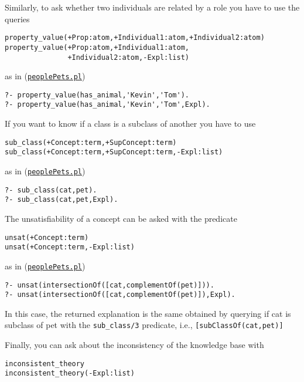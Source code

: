 Similarly, to ask whether two individuals are related by a role you have to use the queries
\begin{verbatim}
property_value(+Prop:atom,+Individual1:atom,+Individual2:atom)
property_value(+Prop:atom,+Individual1:atom,
               +Individual2:atom,-Expl:list)
\end{verbatim}
as in (\href{http://trill.lamping.unife.it/example/trill/peoplePets.pl}{\texttt{peoplePets.pl}})
\begin{verbatim}
?- property_value(has_animal,'Kevin','Tom').
?- property_value(has_animal,'Kevin','Tom',Expl).
\end{verbatim}

If you want to know if a class is a subclass of another you have to use
\begin{verbatim}
sub_class(+Concept:term,+SupConcept:term)
sub_class(+Concept:term,+SupConcept:term,-Expl:list)
\end{verbatim}
as in (\href{http://trill.lamping.unife.it/example/trill/peoplePets.pl}{\texttt{peoplePets.pl}})
\begin{verbatim}
?- sub_class(cat,pet).
?- sub_class(cat,pet,Expl).
\end{verbatim}

The unsatisfiability of a concept can be asked with the predicate
\begin{verbatim}
unsat(+Concept:term)
unsat(+Concept:term,-Expl:list)
\end{verbatim}
as in (\href{http://trill.lamping.unife.it/example/trill/peoplePets.pl}{\texttt{peoplePets.pl}})
\begin{verbatim}
?- unsat(intersectionOf([cat,complementOf(pet)])).
?- unsat(intersectionOf([cat,complementOf(pet)]),Expl).
\end{verbatim}
In this case, the returned explanation is the same obtained by querying if cat is subclass of pet with the \verb|sub_class/3| predicate, i.e., \verb|[subClassOf(cat,pet)]|

Finally, you can ask about the inconsistency of the knowledge base with
\begin{verbatim}
inconsistent_theory
inconsistent_theory(-Expl:list)
\end{verbatim}

